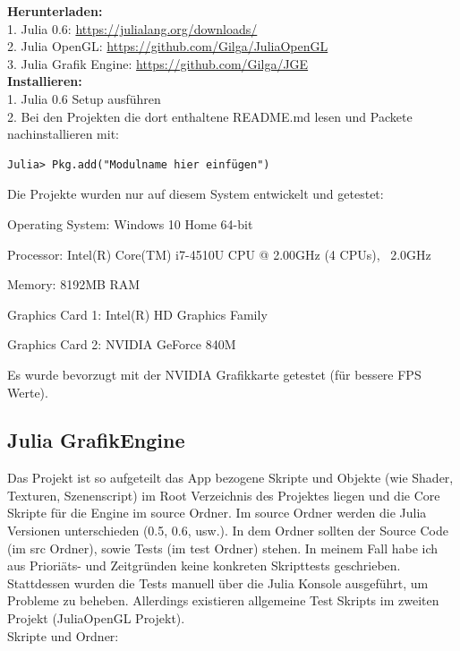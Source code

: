 \documentclass[11pt]{article}
\begin{document}
\textbf{Herunterladen:}\\
1. Julia 0.6: \url{https://julialang.org/downloads/}\\
2. Julia OpenGL: \url{https://github.com/Gilga/JuliaOpenGL}\\
3. Julia Grafik Engine: \url{https://github.com/Gilga/JGE}\\

\textbf{Installieren:}\\
1. Julia 0.6 Setup ausführen\\
2. Bei den Projekten die dort enthaltene README.md lesen und Packete nachinstallieren mit:
\begin{lstlisting}
Julia> Pkg.add("Modulname hier einfügen")
\end{lstlisting}

Die Projekte wurden nur auf diesem System entwickelt und getestet:

\begin{flushleft}
\begin{compactitem}
\item Operating System: Windows 10 Home 64-bit
\item Processor: Intel(R) Core(TM) i7-4510U CPU @ 2.00GHz (4 CPUs), ~2.0GHz
\item Memory: 8192MB RAM
\item Graphics Card 1: Intel(R) HD Graphics Family
\item Graphics Card 2: NVIDIA GeForce 840M
\end{compactitem}
\end{flushleft}

Es wurde bevorzugt mit der NVIDIA Grafikkarte getestet (für bessere FPS Werte).

\subsection{Julia GrafikEngine}
Das Projekt ist so aufgeteilt das App bezogene Skripte und Objekte (wie Shader, Texturen, Szenenscript) im Root Verzeichnis des Projektes liegen und die Core Skripte für die Engine im source Ordner. Im source Ordner werden die Julia Versionen unterschieden (0.5, 0.6, usw.). In dem Ordner sollten der Source Code (im src Ordner), sowie Tests (im test Ordner) stehen. In meinem Fall habe ich aus Prioriäts- und Zeitgründen keine konkreten Skripttests geschrieben. Stattdessen wurden die Tests manuell über die Julia Konsole ausgeführt, um Probleme zu beheben. Allerdings existieren allgemeine Test Skripts im zweiten Projekt (JuliaOpenGL Projekt).\\
\noindent\minipage[t]{\textwidth}
Skripte und Ordner:\\
\noindent{}
\end{document}
